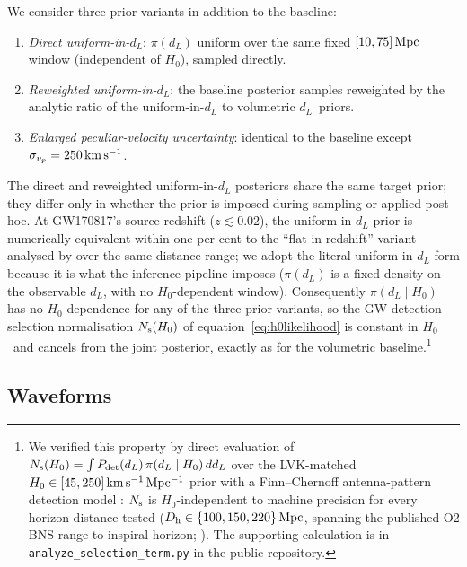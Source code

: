 \documentclass[usenatbib]{mnras}
\newcommand{\kmsmpc}{\ensuremath{\,\rm km\,s^{-1}\,Mpc^{-1}}\xspace}
\newcommand{\kms}{\ensuremath{\,\rm km\,s^{-1}}\xspace}
\newcommand{\hzero}{\ensuremath{H_{0}}\xspace}
\newcommand{\dL}{\ensuremath{d_{L}}\xspace}
\newcommand{\sigmavp}{\ensuremath{\sigma_{v_p}}\xspace}
\begin{document}
We consider three prior variants in addition to the baseline:
\begin{enumerate}
    \item \emph{Direct uniform-in-$d_L$}: $\pi(\dL)$ uniform over the same fixed $[10,75]\,\rm Mpc$ window (independent of \hzero), sampled directly.
    \item \emph{Reweighted uniform-in-$d_L$}: the baseline posterior samples reweighted by the analytic ratio of the uniform-in-$d_L$ to volumetric \dL\ priors.
    \item \emph{Enlarged peculiar-velocity uncertainty}: identical to the baseline except $\sigmavp=250\kms$.
\end{enumerate}
The direct and reweighted uniform-in-$d_L$ posteriors share the same target prior; they differ only in whether the prior is imposed during sampling or applied post-hoc. At GW170817's source redshift ($z\lesssim 0.02$), the uniform-in-$d_L$ prior is numerically equivalent within one per cent to the ``flat-in-redshift'' variant analysed by \citet{Abbott2017H0} over the same distance range; we adopt the literal uniform-in-$d_L$ form because it is what the inference pipeline imposes ($\pi(\dL)$ is a fixed density on the observable \dL, with no \hzero-dependent window). Consequently $\pi(\dL\mid\hzero)$ has no \hzero-dependence for any of the three prior variants, so the GW-detection selection normalisation $N_{\rm s}(\hzero)$ of equation~\ref{eq:h0likelihood} is constant in \hzero\ and cancels from the joint posterior, exactly as for the volumetric baseline.\footnote{\raggedright We verified this property by direct evaluation of $N_{\rm s}(\hzero)=\int P_{\rm det}(\dL)\,\pi(\dL\mid\hzero)\,d\dL$ over the LVK-matched $\hzero\in[45,250]\kmsmpc$ prior with a Finn--Chernoff antenna-pattern detection model \citep{FinnChernoff1993}: $N_{\rm s}$ is \hzero-independent to machine precision for every horizon distance tested ($D_{\rm h}\in\{100,150,220\}\,\rm Mpc$, spanning the published O2 BNS range to inspiral horizon; \citealp{LVK2020Prospects}). The supporting calculation is in \texttt{analyze\_selection\_term.py} in the public repository.}

\subsection{Waveforms}
\label{sec:waveforms}
\end{document}
